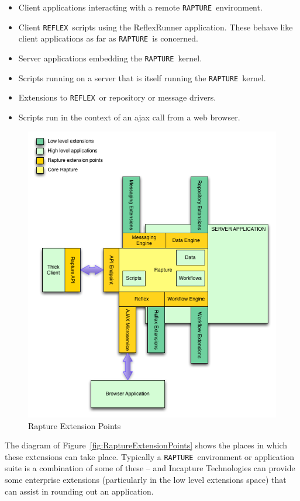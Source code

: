 \documentclass[12pt,twoside,a4paper]{book}
\newcommand{\Rapture}{\Verb+RAPTURE+~}
\newcommand{\Reflex}{\Verb+REFLEX+~}
\begin{document}
\begin{itemize}
  \item{Client applications interacting with a remote \Rapture environment.}
  \item{Client \Reflex scripts using the ReflexRunner application. These behave like client applications as far as \Rapture is concerned.}
  \item{Server applications embedding the \Rapture kernel.}
  \item{Scripts running on a server that is itself running the \Rapture kernel.}
  \item{Extensions to \Reflex or repository or message drivers.}
  \item{Scripts run in the context of an ajax call from a web browser.}
\end{itemize}

\begin{figure}[H]
\centering
\includegraphics[scale=0.75]{Graphics/RaptureExtensionPoints}
\caption{Rapture Extension Points}
\label{fig:RaptureExtensionPoints}
\end{figure}

The diagram of Figure~\vref{fig:RaptureExtensionPoints} shows the places in which these extensions can take
place. Typically a \Rapture environment or application suite is a combination of some of these -- and Incapture Technologies
can provide some enterprise extensions (particularly in the low level extensions space) that can assist in rounding out an
application.
\end{document}
